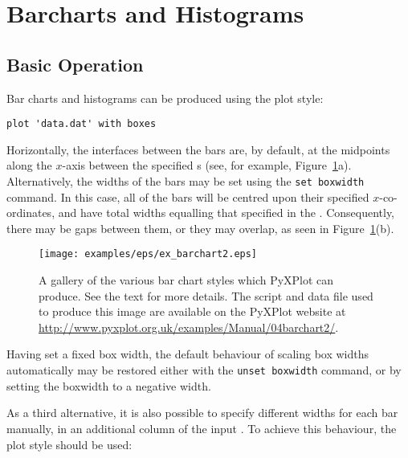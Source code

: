 \section{Barcharts and Histograms}
\label{sec:barcharts}

\subsection{Basic Operation}

Bar charts and histograms can be produced using the  plot style:

\begin{verbatim} 
plot 'data.dat' with boxes
\end{verbatim}

\noindent Horizontally, the interfaces between the bars are, by default, at the
midpoints along the $x$-axis between the specified \datapoint s (see, for
example, Figure~\ref{fig:ex_barchart2}a).  Alternatively, the widths of the
bars may be set using the {\tt set boxwidth} command. In this case, all of
the bars will be centred upon their specified $x$-co-ordinates, and have total
widths equalling that specified in the . Consequently, there may be
gaps between them, or they may overlap, as seen in
Figure~\ref{fig:ex_barchart2}(b).

\begin{figure}
\begin{center}
\texttt{[image: examples/eps/ex\_barchart2.eps]}
\end{center}
\caption[A gallery of the various bar chart styles which PyXPlot can produce]
{A gallery of the various bar chart styles which PyXPlot can produce.
See the text for more details.  The script and data file used to produce this
image are available on the PyXPlot website at
\protect\url{http://www.pyxplot.org.uk/examples/Manual/04barchart2/}.}
\label{fig:ex_barchart2}
\end{figure}

Having set a fixed box width, the default behaviour of scaling box widths
automatically may be restored either with the {\tt unset boxwidth} command,
or by setting the boxwidth to a negative width.

As a third alternative, it is also possible to specify different widths for
each bar manually, in an additional column of the input \datafile. To achieve
this behaviour, the  plot style should be used:

